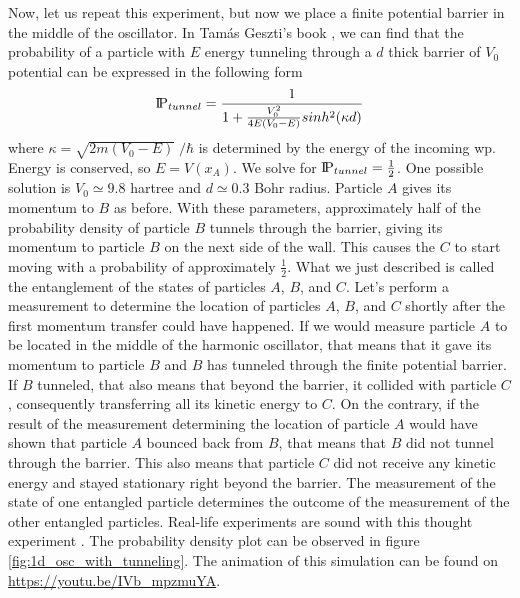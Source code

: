 Now, let us repeat this experiment, but now we place a finite potential barrier in the middle of the oscillator.
In Tamás Geszti's book \cite{geszti2007}, we can find that the probability of a particle with $E$ energy tunneling through a $d$ thick barrier of $V_0$ potential can be expressed in the following form
\begin{equation}
	\label{eq:tunneling_probability}
	\text{I\kern-0.15em P}_{tunnel} = \frac{1}{1 + \frac{V_0^2}{4E(V_0 - E)}sinh^2(\kappa d)}
\end{equation}
where $\kappa = \sqrt{2m(V_0 - E)}\;/\hbar$ is determined by the energy of the incoming \acrshort{wp}.
Energy is conserved, so $E = V(x_A)$.
We solve for $\text{I\kern-0.15em P}_{tunnel} = \frac{1}{2}$.
One possible solution is $V_0 \simeq 9.8$ hartree and $d \simeq 0.3$ Bohr radius.
Particle $A$ gives its momentum to $B$ as before.
With these parameters, approximately half of the probability density of particle $B$ tunnels through the barrier, giving its momentum to particle $B$ on the next side of the wall.
This causes the $C$ to start moving with a probability of approximately $\frac{1}{2}$.
What we just described is called the entanglement of the states of particles $A$, $B$, and $C$.
Let's perform a measurement to determine the location of particles $A$, $B$, and $C$ shortly after the first momentum transfer could have happened.
If we would measure particle $A$ to be located in the middle of the harmonic oscillator, that means that it gave its momentum to particle $B$ and $B$ has tunneled through the finite potential barrier.
If $B$ tunneled, that also means that beyond the barrier, it collided with particle $C$, consequently transferring all its kinetic energy to $C$.
On the contrary, if the result of the measurement determining the location of particle $A$ would have shown that particle $A$ bounced back from $B$, that means that $B$ did not tunnel through the barrier.
This also means that particle $C$ did not receive any kinetic energy and stayed stationary right beyond the barrier.
The measurement of the state of one entangled particle determines the outcome of the measurement of the other entangled particles.
Real-life experiments are sound with this thought experiment \cite{Vasilyev2017}.
The probability density plot can be observed in figure \ref{fig:1d_osc_with_tunneling}.
The animation of this simulation can be found on \url{https://youtu.be/IVb_mpzmuYA}.
